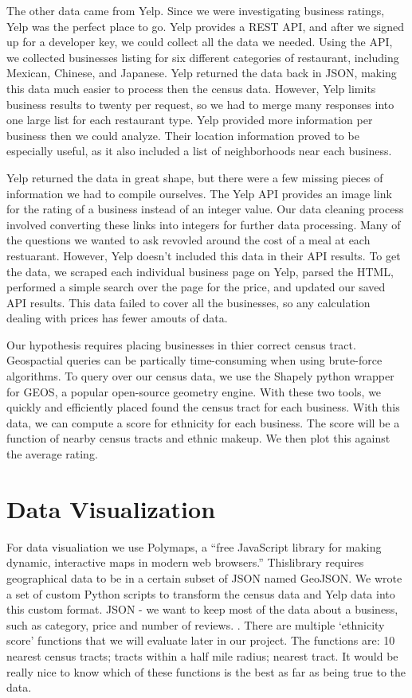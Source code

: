 \documentclass[11pt,twocolumn]{article}
\begin{document}
The other data came from Yelp. Since we were investigating business ratings, Yelp was the perfect place to go. Yelp provides a REST API, and after we signed up for a developer key, we could collect all the data we needed. Using the API, we collected businesses listing for six different categories of restaurant, including Mexican, Chinese, and Japanese. Yelp returned the data back in JSON, making this data much easier to process then the census data. However, Yelp limits business results to twenty per request, so we had to merge many responses into one large list for each restaurant type. Yelp provided more information per business then we could analyze. Their location information proved to be especially useful, as it also included a list of neighborhoods near each business.

Yelp returned the data in great shape, but there were a few missing pieces of information we had to compile ourselves. The Yelp API provides an image link for the rating of a business instead of an integer value. Our data cleaning process involved converting these links into integers for further data processing. Many of the questions we wanted to ask revovled around the cost of a meal at each restuarant. However, Yelp doesn't included this data in their API results. To get the data, we scraped each individual business page on Yelp, parsed the HTML, performed a simple search over the page for the price, and updated our saved API results. This data failed to cover all the businesses, so any calculation dealing with prices has fewer amouts of data.

Our hypothesis requires placing businesses in thier correct census tract. Geospactial queries can be partically time-consuming when using brute-force algorithms. To query over our census data, we use the Shapely python wrapper for GEOS, a popular open-source geometry engine. With these two tools, we quickly and efficiently placed found the census tract for each business. With this data, we can compute a score for ethnicity for each business. The score will be a function of nearby census tracts and ethnic makeup. We then plot this against the average rating.

\section{Data Visualization}

For data visualiation we use Polymaps, a ``free JavaScript library for making dynamic, interactive maps in modern web browsers.'' Thislibrary requires geographical data to be in a certain subset of JSON named GeoJSON. We wrote a set of custom Python scripts to transform the census data and Yelp data into this custom format. JSON - we want to keep most of the data about a business, such as category, price and number of reviews. . There are multiple ‘ethnicity score’ functions that we will evaluate later in our project. The functions are: 10 nearest census tracts; tracts within a half mile radius; nearest tract. It would be really nice to know which of these functions is the best as far as being true to the data.
\end{document}
